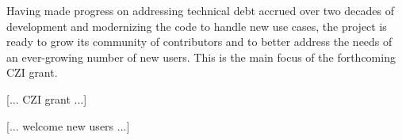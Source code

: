 

Having made progress on addressing technical debt accrued over two decades of
development and modernizing the code to handle new use cases, the project
is ready to grow its community of contributors and to better address the needs
of an ever-growing number of new users.  This is the main focus of the
forthcoming CZI grant.

[... CZI grant ...]

[... welcome new users ...]






